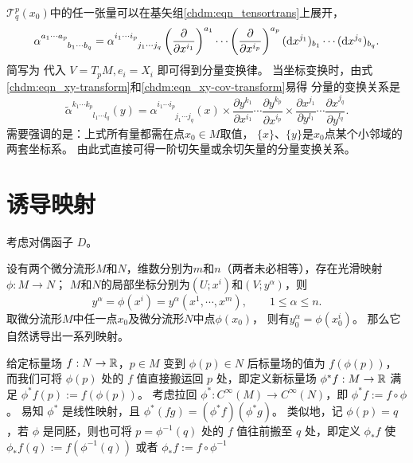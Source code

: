 $\mathcal{T}^p_q(x_0)$中的任一张量可以在基矢组\eqref{chdm:eqn_tensortrans}上展开，
\begin{equation}\label{chdm:eqn_tensor-component}
    \alpha^{a_1 \cdots a_p}_{\phantom{a_1 \cdots a_p}b_1\cdots b_q} 
     = \alpha^{i_1 \cdots i_p}_{\phantom{i_1 \cdots i_p}j_1\cdots j_q} 
      \left(\frac{\partial }{\partial x^{i_1}}\right)^{a_1} \cdots 
      \left(\frac{\partial }{\partial x^{i_p}}\right)^{a_p} 
      ({\rm d}x^{j_1})_{b_1} \cdots  ({\rm d}x^{j_q})_{b_q}    .
\end{equation}
简写为
代入 $V=T_p M,e_i=X_i$ 即可得到分量变换律。
当坐标变换时，由式\eqref{chdm:eqn_xy-transform}和\eqref{chdm:eqn_xy-cov-transform}易得
分量的变换关系是
\begin{equation}\label{chdm:eqn_tensor-component-trans}
    \tilde{\alpha}^{k_1 \cdots k_p}_{\phantom{k_1 \cdots k_p}l_1\cdots l_q} (y)
    ={\alpha}^{i_1 \cdots i_p}_{\phantom{i_1 \cdots i_p}j_1\cdots j_q} (x) \times
    \frac{\partial y^{k_1}}{\partial x^{i_1}} \cdots 
    \frac{\partial y^{k_p}}{\partial x^{i_p}} \times
    \frac{\partial x^{j_1}}{\partial y^{l_1}} \cdots 
    \frac{\partial x^{j_q}}{\partial y^{l_q}} .
\end{equation}
需要强调的是：上式所有量都需在点$x_0\in M$取值，
$\{x\}$、$\{y\}$是$x_0$点某个小邻域的两套坐标系。
由此式直接可得一阶切矢量或余切矢量的分量变换关系。

\section{诱导映射}\label{chdm:sec_induced-map}

考虑对偶函子 $D$。

设有两个微分流形$M$和$N$，维数分别为$m$和$n$（两者未必相等），存在光滑映射$\phi:M\to N$；
$M$和$N$的局部坐标分别为$(U;x^i)$和$(V;y^\alpha)$，则
\begin{equation}
    y^\alpha = \phi(x^i)=y^\alpha (x^1,\cdots, x^m), \qquad 1\leqslant \alpha \leqslant n .
\end{equation}
取微分流形$M$中任一点$x_0$及微分流形$N$中点$\phi(x_0)$，
则有$y^\alpha_0=\phi(x^i_0)$。
那么它自然诱导出一系列映射。


给定标量场 $f:N\to\mathbb{R}$，$p\in M$ 变到 $\phi(p)\in N$ 后标量场的值为 $f(\phi(p))$，而我们可将 $\phi(p)$ 处的 $f$ 值直接搬运回 $p$ 处，即定义新标量场 $\phi^* f:M\to\mathbb{R}$ 满足 $\phi^* f(p):=f(\phi(p))$。
考虑拉回 $\phi^*:C^\infty(M)\to C^\infty(N)$，即 $\phi^* f:=f\circ\phi$。
易知 $\phi^*$ 是线性映射，且 $\phi^*(fg)=(\phi^* f) (\phi^* g)$。
类似地，记 $\phi(p)=q$，若 $\phi$ 是同胚，则也可将 $p=\phi^{-1}(q)$ 处的 $f$ 值往前搬至 $q$ 处，即定义 $\phi_* f$ 使 $\phi_* f(q):=f(\phi^{-1}(q))$ 或者 $\phi_* f:=f\circ\phi^{-1}$

